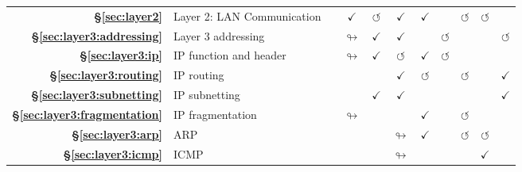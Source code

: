 {\begin{tabular}{rl ccccccccc}
    \textbf{\S\ref{sec:layer2}}    & Layer 2: LAN Communication                       &                   & $\checkmark$       & $\circlearrowleft$ & $\checkmark$       & $\checkmark$       &                      & $\circlearrowleft$      & $\circlearrowleft$   &                      \\
    \rowcolor{color1!15!white}
    \textbf{\S\ref{sec:layer3:addressing}}  & Layer 3 addressing                               &                   & $\looparrowright$  & $\checkmark$       & $\checkmark$       &                    & $\circlearrowleft$   &                         &                      & $\circlearrowleft$   \\
    \textbf{\S\ref{sec:layer3:ip}}  & IP function and header                                               &                   & $\looparrowright$  & $\checkmark$       & $\circlearrowleft$ & $\checkmark$       & $\circlearrowleft$   &                         &                      &                      \\
    \rowcolor{color1!15!white}
    \textbf{\S\ref{sec:layer3:routing}}  & IP routing                                       &                   &                    &                    & $\checkmark$       & $\circlearrowleft$ &                      & $\circlearrowleft$      &                      & $\checkmark$         \\
    \textbf{\S\ref{sec:layer3:subnetting}}  & IP subnetting                                    &                   &                    & $\checkmark$       & $\checkmark$       &                    &                      &                         &                      & $\checkmark$         \\
    \rowcolor{color1!15!white}
    \textbf{\S\ref{sec:layer3:fragmentation}}  & IP fragmentation                                 &                   & $\looparrowright$  &                    &                    & $\checkmark$       &                      & $\circlearrowleft$      &                      &                      \\
    \textbf{\S\ref{sec:layer3:arp}}  & ARP                                              &                   &                    &                    & $\looparrowright$  & $\checkmark$       &                      & $\circlearrowleft$      & $\circlearrowleft$   &                      \\
    \rowcolor{color1!15!white}
    \textbf{\S\ref{sec:layer3:icmp}}  & ICMP                                             &                   &                    &                    & $\looparrowright$  &                    &                      &                         & $\checkmark$         &                      \\

\end{tabular}}
